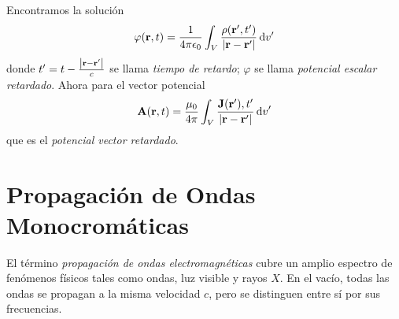 Encontramos la solución 
\begin{equation}
    \varphi (\vb{r} ,t) = \frac{1}{4\pi \epsilon_0} \int _V \frac{\rho (\vb{r} ^\prime, t^\prime)}{\abs{\vb{r} - \vb{r}^\prime}} \dd{v^\prime}
\end{equation}
donde $t^\prime = t - \frac{\abs{\vb{r} - \vb{r}^\prime}}{c}$ se llama \textit{tiempo de retardo}; $\varphi$ se llama \textit{potencial escalar retardado}. Ahora para el vector potencial
\begin{equation}
    \vb{A} (\vb{r} ,t) = \frac{\mu_0}{4\pi} \int _V \frac{\vb{J} (\vb{r}^\prime) ,t^\prime}{\abs{\vb{r} - \vb{r}^\prime}} \dd{v}^\prime
\end{equation}
que es el \textit{potencial vector retardado}.






\chapter{Propagación de Ondas Monocromáticas}
El término \textit{propagación de ondas electromagnéticas} cubre un amplio espectro de fenómenos físicos tales como ondas, luz visible y rayos $X$. En el vacío, todas las ondas se propagan a la misma velocidad $c$, pero se distinguen entre sí por sus frecuencias.

